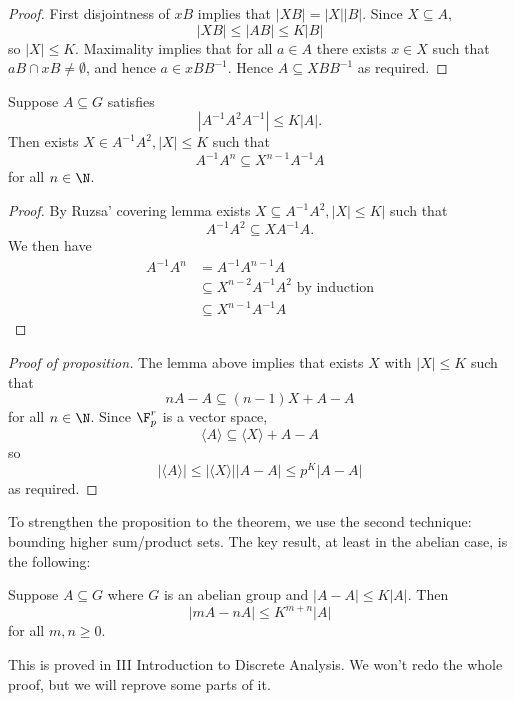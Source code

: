 \documentclass[a4paper]{article}
\begin{document}
\begin{proof}
  First disjointness of \(xB\) implies that \(|XB| = |X||B|\). Since \(X \subseteq A\),
  \[
    |XB| \leq |AB| \leq K|B|
  \]
  so \(|X| \leq K\). Maximality implies that for all \(a \in A\) there exists \(x \in X\) such that \(aB \cap xB \neq \emptyset\), and hence \(a \in xBB^{-1}\). Hence \(A \subseteq XBB^{-1}\) as required.
\end{proof}

\begin{lemma}
  Suppose \(A \subseteq G\) satisfies
  \[
    |A^{-1}A^2 A^{-1}| \leq K |A|.
  \]
  Then exists \(X \in A^{-1}A^2, |X| \leq K\) such that
  \[
    A^{-1}A^n \subseteq X^{n - 1}A^{-1}A
  \]
  for all \(n \in \N\).
\end{lemma}

\begin{proof}
  By Ruzsa' covering lemma exists \(X \subseteq A^{-1}A^2, |X| \leq K|\) such that
  \[
    A^{-1}A^2 \subseteq XA^{-1}A.
  \]
  We then have
  \begin{align*}
    A^{-1}A^n
    &= A^{-1}A^{n - 1}A \\
    &\subseteq X^{n - 2}A^{-1}A^2 \text{ by induction} \\
    &\subseteq X^{n - 1} A^{-1}A
  \end{align*}
\end{proof}

\begin{proof}[Proof of proposition]
  The lemma above implies that exists \(X\) with \(|X| \leq K\) such that
  \[
    nA - A \subseteq (n - 1) X + A - A
  \]
  for all \(n \in \N\). Since \(\F_p^r\) is a vector space,
  \[
    \langle A \rangle \subseteq \langle X \rangle + A - A
  \]
  so
  \[
    |\langle A \rangle| \leq |\langle X \rangle| |A - A| \leq p^K|A - A|
  \]
  as required.
\end{proof}

To strengthen the proposition to the theorem, we use the second technique: bounding higher sum/product sets. The key result, at least in the abelian case, is the following:

\begin{theorem}
  Suppose \(A \subseteq G\) where \(G\) is an abelian group and \(|A - A| \leq K |A|\). Then
  \[
    |mA - nA| \leq K^{m + n} |A|
  \]
  for all \(m, n \geq 0\).
\end{theorem}

This is proved in III Introduction to Discrete Analysis. We won't redo the whole proof, but we will reprove some parts of it.
\end{document}
